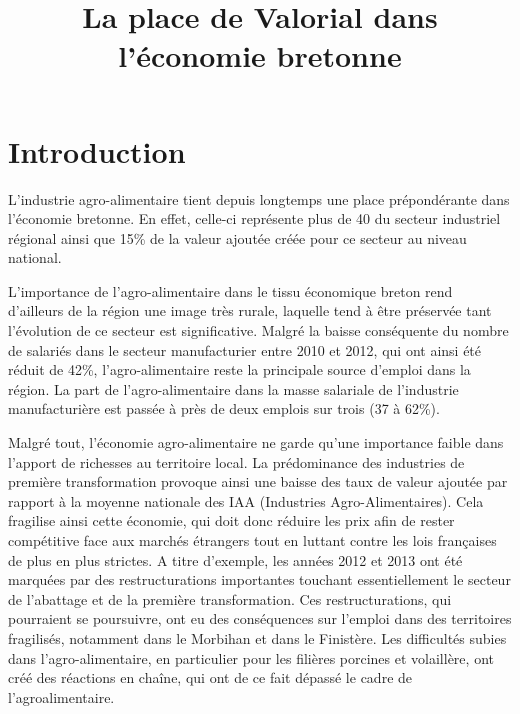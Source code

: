 \documentclass[a4paper,10pt]{report}
\title{La place de Valorial dans l'économie bretonne}
\author{ \bsc{Aurélien Fontaine}
	\and \bsc{Manuteau Huang} 
	\and \bsc{Nicolas Le Borgne}
	\and \bsc{Maxime Cadoret}
	\and \bsc{Flavien Lecuyer}
}
\begin{document}
	\maketitle
	\setcounter{tocdepth}{2}
	\tableofcontents
	
\chapter*{Introduction}
	 L’industrie agro-alimentaire tient depuis longtemps une place prépondérante dans l’économie bretonne. En effet, celle-ci représente plus de 40 du secteur industriel régional ainsi que 15\% de la valeur ajoutée créée pour ce secteur au niveau national. 
	 
	 L’importance de l’agro-alimentaire dans le tissu économique breton rend d’ailleurs de la région une image très rurale, laquelle tend à être préservée tant l’évolution de ce secteur est significative. Malgré la baisse conséquente du nombre de salariés dans le secteur manufacturier entre 2010 et 2012, qui ont ainsi été réduit de 42\%, l’agro-alimentaire reste la principale source d’emploi dans la région. La part de l’agro-alimentaire dans la masse salariale de l’industrie manufacturière est passée à près de deux emplois sur trois (37 à 62\%).
	 
	 Malgré tout, l’économie agro-alimentaire ne garde qu’une importance faible dans l’apport de richesses au territoire local. La prédominance des industries de première transformation provoque ainsi une baisse des taux de valeur ajoutée par rapport à la moyenne nationale des IAA (Industries Agro-Alimentaires). Cela fragilise ainsi cette économie, qui doit donc réduire les prix afin de rester compétitive face aux marchés étrangers tout en luttant contre les lois françaises de plus en plus strictes. A titre d’exemple, les années 2012 et 2013 ont été marquées par des restructurations importantes touchant essentiellement le secteur de l’abattage et de la première transformation. Ces restructurations, qui pourraient se poursuivre, ont eu des conséquences sur l’emploi dans des territoires fragilisés, notamment dans le Morbihan et dans le Finistère. Les difficultés subies dans l’agro-alimentaire, en particulier pour les filières porcines et volaillère, ont créé des réactions en chaîne, qui ont de ce fait dépassé le cadre de l’agroalimentaire.
	 
\end{document}

